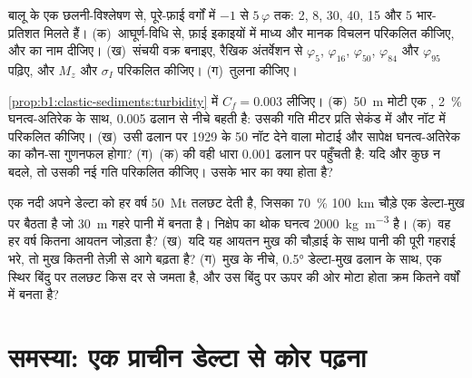 \begin{exercise}[$\star\star\star$]\label{exo:b1:clastic-sediments:10}
बालू के एक छलनी-विश्लेषण से, पूरे-फ़ाई वर्गों में $-1$ से $5\,\varphi$ तक: 2, 8, 30, 40, 15 और 5 भार-प्रतिशत मिलते हैं। (क)~आघूर्ण-विधि से, फ़ाई इकाइयों में माध्य और मानक विचलन परिकलित कीजिए, और  का नाम दीजिए। (ख)~संचयी वक्र बनाइए, रैखिक अंतर्वेशन से $\varphi_5$, $\varphi_{16}$, $\varphi_{50}$, $\varphi_{84}$ और $\varphi_{95}$ पढ़िए, और $M_z$ और $\sigma_I$ परिकलित कीजिए। (ग)~तुलना कीजिए।
\end{exercise}

\begin{exercise}[$\star\star\star$]\label{exo:b1:clastic-sediments:11}
\cref{prop:b1:clastic-sediments:turbidity} में $C_f = 0.003$ लीजिए। (क)~\qty{50}{m} मोटी एक , \qty{2}{\percent} घनत्व-अतिरेक के साथ, \num{0.005} ढलान से नीचे बहती है: उसकी गति मीटर प्रति सेकंड में और नॉट में परिकलित कीजिए। (ख)~उसी ढलान पर 1929 के 50 नॉट देने वाला मोटाई और सापेक्ष घनत्व-अतिरेक का कौन-सा गुणनफल होगा? (ग)~(क) की वही धारा \num{0.001} ढलान पर पहुँचती है: यदि और कुछ न बदले, तो उसकी नई गति परिकलित कीजिए। उसके भार का क्या होता है?
\end{exercise}

\begin{exercise}[$\star\star\star$]\label{exo:b1:clastic-sediments:12}
एक नदी अपने डेल्टा को हर वर्ष \qty{50}{Mt} तलछट देती है, जिसका \qty{70}{\percent} \qty{100}{km} चौड़े एक डेल्टा-मुख पर बैठता है जो \qty{30}{m} गहरे पानी में बनता है। निक्षेप का थोक घनत्व \qty{2000}{kg.m^{-3}} है। (क)~वह हर वर्ष कितना आयतन जोड़ता है? (ख)~यदि यह आयतन मुख की चौड़ाई के साथ पानी की पूरी गहराई भरे, तो मुख कितनी तेज़ी से आगे बढ़ता है? (ग)~मुख के नीचे, \ang{0.5} डेल्टा-मुख ढलान के साथ, एक स्थिर बिंदु पर तलछट किस दर से जमता है, और उस बिंदु पर ऊपर की ओर मोटा होता क्रम कितने वर्षों में बनता है?
\end{exercise}

\section{समस्या: एक प्राचीन डेल्टा से कोर पढ़ना}

